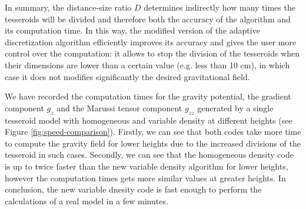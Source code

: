 \documentclass[extra]{gji}
\begin{document}
In summary, the distance-size ratio $D$ determines indirectly how many times the tesseroids will be divided and therefore both the accuracy of the algorithm and its computation time.
In this way, the modified version of the adaptive discretization algorithm efficiently improves its accuracy and gives the user more control over the computation: it allows to stop the division of the tesseroids when their dimensions are lower than a certain value (e.g. less than 10 cm), in which case it does not modifies significantly the desired gravitational field.

We have recorded the computation times for the gravity potential, the gradient component $g_z$ and the Marussi tensor component $g_{zz}$ generated by a single tesseroid model with homogeneous and variable density at different heights (see Figure \ref{fig:speed-comparison}).
Firstly, we can see that both codes take more time to compute the gravity field for lower heights due to the increased divisions of the tesseroid in such cases.
Secondly, we can see that the homogeneous density code is up to twice faster than the new variable density algorithm for lower heights, however the computation times gets more similar values at greater heights. In conclusion, the new variable dnesity code is fast enough to perform the calculations of a real model in a few minutes. 
\end{document}
